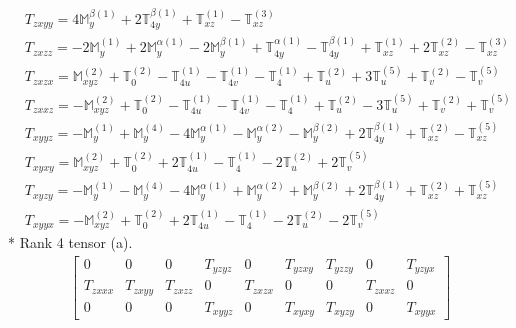 \documentclass[fleqn,8pt,landscape]{jsarticle}
\begin{document}
\begin{align*}
& T_{zxyy} = 4 \mathbb{M}_{y}^{\beta(1)} + 2 \mathbb{T}_{4y}^{\beta(1)} + \mathbb{T}_{xz}^{(1)} - \mathbb{T}_{xz}^{(3)} \\
& T_{zxzz} = - 2 \mathbb{M}_{y}^{(1)} + 2 \mathbb{M}_{y}^{\alpha(1)} - 2 \mathbb{M}_{y}^{\beta(1)} + \mathbb{T}_{4y}^{\alpha(1)} - \mathbb{T}_{4y}^{\beta(1)} + \mathbb{T}_{xz}^{(1)} + 2 \mathbb{T}_{xz}^{(2)} - \mathbb{T}_{xz}^{(3)} \\
& T_{zxzx} = \mathbb{M}_{xyz}^{(2)} + \mathbb{T}_{0}^{(2)} - \mathbb{T}_{4u}^{(1)} - \mathbb{T}_{4v}^{(1)} - \mathbb{T}_{4}^{(1)} + \mathbb{T}_{u}^{(2)} + 3 \mathbb{T}_{u}^{(5)} + \mathbb{T}_{v}^{(2)} - \mathbb{T}_{v}^{(5)} \\
& T_{zxxz} = - \mathbb{M}_{xyz}^{(2)} + \mathbb{T}_{0}^{(2)} - \mathbb{T}_{4u}^{(1)} - \mathbb{T}_{4v}^{(1)} - \mathbb{T}_{4}^{(1)} + \mathbb{T}_{u}^{(2)} - 3 \mathbb{T}_{u}^{(5)} + \mathbb{T}_{v}^{(2)} + \mathbb{T}_{v}^{(5)} \\
& T_{xyyz} = - \mathbb{M}_{y}^{(1)} + \mathbb{M}_{y}^{(4)} - 4 \mathbb{M}_{y}^{\alpha(1)} - \mathbb{M}_{y}^{\alpha(2)} - \mathbb{M}_{y}^{\beta(2)} + 2 \mathbb{T}_{4y}^{\beta(1)} + \mathbb{T}_{xz}^{(2)} - \mathbb{T}_{xz}^{(5)} \\
& T_{xyxy} = \mathbb{M}_{xyz}^{(2)} + \mathbb{T}_{0}^{(2)} + 2 \mathbb{T}_{4u}^{(1)} - \mathbb{T}_{4}^{(1)} - 2 \mathbb{T}_{u}^{(2)} + 2 \mathbb{T}_{v}^{(5)} \\
& T_{xyzy} = - \mathbb{M}_{y}^{(1)} - \mathbb{M}_{y}^{(4)} - 4 \mathbb{M}_{y}^{\alpha(1)} + \mathbb{M}_{y}^{\alpha(2)} + \mathbb{M}_{y}^{\beta(2)} + 2 \mathbb{T}_{4y}^{\beta(1)} + \mathbb{T}_{xz}^{(2)} + \mathbb{T}_{xz}^{(5)} \\
& T_{xyyx} = - \mathbb{M}_{xyz}^{(2)} + \mathbb{T}_{0}^{(2)} + 2 \mathbb{T}_{4u}^{(1)} - \mathbb{T}_{4}^{(1)} - 2 \mathbb{T}_{u}^{(2)} - 2 \mathbb{T}_{v}^{(5)}
\end{align*}
* Rank 4 tensor (a).
\begin{align*}
\begin{bmatrix} 0 & 0 & 0 & T_{yzyz} & 0 & T_{yzxy} & T_{yzzy} & 0 & T_{yzyx} \\ T_{zxxx} & T_{zxyy} & T_{zxzz} & 0 & T_{zxzx} & 0 & 0 & T_{zxxz} & 0 \\ 0 & 0 & 0 & T_{xyyz} & 0 & T_{xyxy} & T_{xyzy} & 0 & T_{xyyx} \end{bmatrix}
\end{align*}
\end{document}
